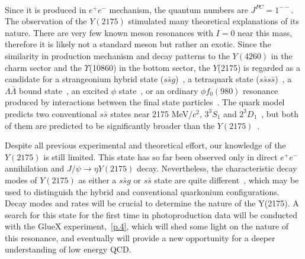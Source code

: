 ~\par Since it is produced in $e^+e^-$ mechanism, the quantum numbers are $J^{PC} = 1^{--}$. The observation of the $Y(2175)$ stimulated many theoretical explanations of its nature. There are very few known meson resonances with $I = 0$ near this mass, therefore it is likely not a standard meson but rather an exotic. Since the similarity in production mechanism and decay patterns to the $Y(4260)$ in the charm sector and the $\Upsilon$(10860) in the bottom sector, the $Y$(2175) is regarded as a candidate for a strangeonium hybrid state ($s\bar{s}g$)~\cite{Gui07}, a tetraquark state ($s\bar{s}s\bar{s}$)~\cite{Chen08}, a $\Lambda \bar{\Lambda}$ bound state~\cite{Klempt07}, an excited $\phi$ state~\cite{Coito09}, or an ordinary $\phi f_0(980)$ resonance produced by interactions between the final state particles~\cite{Alvarez09}. The quark model predicts two conventional $s\bar{s}$ states near 2175 MeV/$c^2$, ${3}^{3}\!S_{1}$ and ${2}^{3}\!D_{1}$~\cite{Godfrey85, Barnes97}, but both of them are predicted to be significantly broader than the $Y(2175)$~\cite{Barnes03, Ding07}.
~\par Despite all previous experimental and theoretical effort, our knowledge of the $Y(2175)$ is still limited. This state has so far been observed only in direct $e^{+}e^{-}$ annihilation and $J/\psi \rightarrow \eta Y(2175)$ decay. Nevertheless, the characteristic decay modes of $Y(2175)$ as either a $s\bar{s}g$ or $s\bar{s}$ state are quite different~\cite{Gui07, Isgur85}, which may be used to distinguish the hybrid and conventional quarkonium configurations. Decay modes and rates will be crucial to determine the nature of the Y(2175). A search for this state for the first time in photoproduction data will be conducted with the GlueX experiment,~\ref{p.4}, which will shed some light on the nature of this resonance, and eventually will provide a new opportunity for a deeper understanding of low energy QCD.

